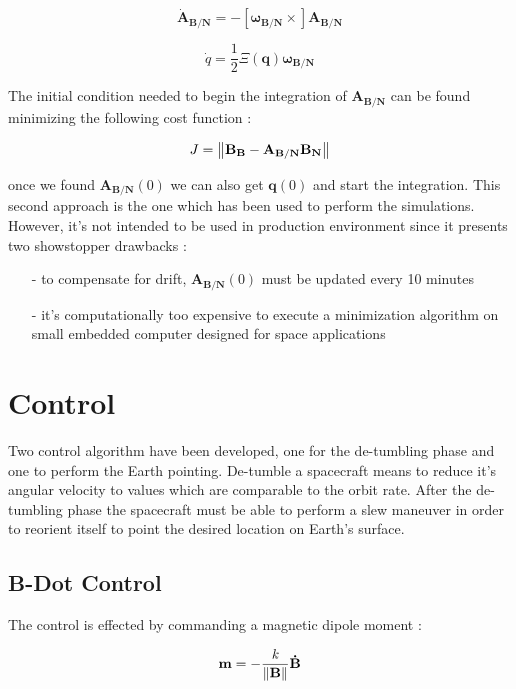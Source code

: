 \documentclass[11pt,a4paper]{report}
\begin{document}
\begin{equation}
 \mathbf{\dot{A}_{B/N}} = - [\mathbf{\omega_{B/N}} \times]\mathbf{A_{B/N}}
\end{equation}

\begin{equation}
 \dot{q} = \frac{1}{2} \mathbf{\varXi(\mathbf{q})} \mathbf{\omega_{B/N}}
\end{equation}

The initial condition needed to begin the integration of $\mathbf{A_{B/N}}$ can be found minimizing the following cost  function :

\begin{equation}
 J = \left\lVert\mathbf{B_{B}} - \mathbf{A_{B/N}\mathbf{B_{N}}}\right\rVert
\end{equation}

once we found $\mathbf{A_{B/N}}(0)$ we can also get $\mathbf{q}(0)$ and start the integration.
This second approach is the one which has been used to perform the simulations.
However, it's not intended to be used in production environment since it presents two showstopper drawbacks :

\begin{itemize}
 \item [-] to compensate for drift, $\mathbf{A_{B/N}}(0)$ must be updated every 10 minutes
 \item [-] it's computationally too expensive to execute a minimization algorithm on small embedded computer designed for space applications
\end{itemize}



\chapter{Control} 
\label{chap:control}
Two control algorithm have been developed, one for the de-tumbling phase and one to perform the Earth pointing.
De-tumble a spacecraft means to reduce it's angular velocity to values which are comparable to the orbit rate.
After the de-tumbling phase the spacecraft must be able to perform a slew maneuver in order to reorient itself to point the desired location on Earth's surface.

\section{B-Dot Control}
The control is effected by commanding a magnetic dipole moment : 

\begin{equation}
 \mathbf{m} = - \frac{\mathit{k}}{\left\lVert\mathbf{B}\right\rVert}\mathbf{\dot{B}}
\end{equation}
\end{document}
